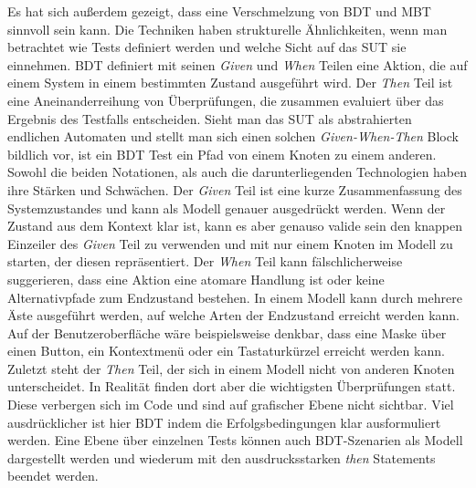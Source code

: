 Es hat sich außerdem gezeigt, dass eine Verschmelzung von \Gls{BDT} und \Gls{MBT} sinnvoll sein kann. Die Techniken haben strukturelle Ähnlichkeiten, wenn man betrachtet wie Tests definiert werden und welche Sicht auf das \Gls{SUT} sie einnehmen. \Gls{BDT} definiert mit seinen \textit{Given} und \textit{When} Teilen eine Aktion, die auf einem System in einem bestimmten Zustand ausgeführt wird. Der \textit{Then} Teil ist eine Aneinanderreihung von Überprüfungen, die zusammen evaluiert über das Ergebnis des Testfalls entscheiden. Sieht man das \Gls{SUT} als abstrahierten endlichen Automaten und stellt man sich einen solchen \textit{Given-When-Then} Block bildlich vor, ist ein \Gls{BDT} Test ein Pfad von einem Knoten zu einem anderen. Sowohl die beiden Notationen, als auch die darunterliegenden Technologien haben ihre Stärken und Schwächen. Der \textit{Given} Teil ist eine kurze Zusammenfassung des Systemzustandes und kann als Modell genauer ausgedrückt werden. Wenn der Zustand aus dem Kontext klar ist, kann es aber genauso valide sein den knappen Einzeiler des \textit{Given} Teil zu verwenden und mit nur einem Knoten im Modell zu starten, der diesen repräsentiert. Der \textit{When} Teil kann fälschlicherweise suggerieren, dass eine Aktion eine atomare Handlung ist oder keine Alternativpfade zum Endzustand bestehen. In einem Modell kann durch mehrere Äste ausgeführt werden, auf welche Arten der Endzustand erreicht werden kann. Auf der Benutzeroberfläche wäre beispielsweise denkbar, dass eine Maske über einen Button, ein Kontextmenü oder ein Tastaturkürzel erreicht werden kann. Zuletzt steht der \textit{Then} Teil, der sich in einem Modell nicht von anderen Knoten unterscheidet. In Realität finden dort aber die wichtigsten Überprüfungen statt. Diese verbergen sich im Code und sind auf grafischer Ebene nicht sichtbar. Viel ausdrücklicher ist hier \Gls{BDT} indem die Erfolgsbedingungen klar ausformuliert werden. Eine Ebene über einzelnen Tests können auch \Gls{BDT}-Szenarien als Modell dargestellt werden und wiederum mit den ausdrucksstarken \textit{then} Statements beendet werden.\\


